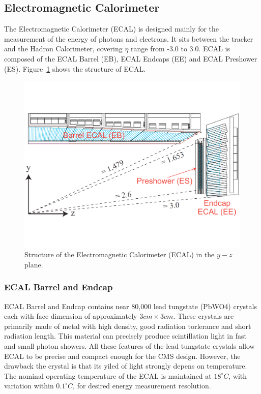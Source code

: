 \subsection{Electromagnetic Calorimeter} 
The Electromagnetic Calorimeter (ECAL)\cite{lhc_ecaldesign} is designed mainly for the measurement of the energy of photons and electrons. It sits between the tracker and the Hadron Calorimeter, covering $\eta$ range from -3.0 to 3.0. ECAL is composed of the ECAL Barrel (EB), ECAL Endcaps (EE) and ECAL Preshower (ES). Figure~\ref{fig:lhc_ecal} shows the structure of ECAL.
\begin{figure}[htbp]
\begin{center}
\includegraphics[width=0.7\linewidth]{figures/lhc_ecal.pdf}
\caption{Structure of the Electromagnetic Calorimeter (ECAL) in the $y-z$ plane.}
\label{fig:lhc_ecal}
\end{center}
\end{figure}

\subsubsection{ECAL Barrel and Endcap}
ECAL Barrel and Endcap contains near 80,000 lead tungstate (PbWO4) crystals each with face dimension of approximately $3cm\times 3cm$. These crystals are primarily made of metal with high density, good radiation torlerance and short radiation length. This material can precisely produce scintillation light in fast and small photon showers. All these features of the lead tungstate crystals allow ECAL to be precise and compact enough for the CMS design. However, the drawback the crystal is that its yiled of light strongly depens on temperature. The nominal operating temperature of the ECAL is maintained at $18^{\circ}C$, with variation within $0.1^{\circ}C$, for desired energy measurement resolution. 

